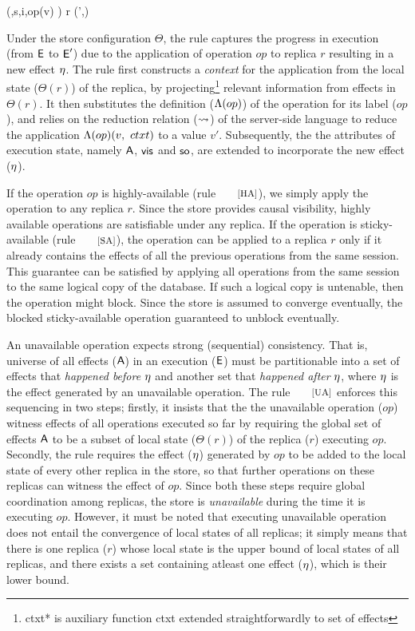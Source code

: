 \begin{smathpar}
\auxred{\Theta} {(\E,\langle s,i,op(v) \rangle)} {r} {(\E',\eff)}
\end{smathpar}

\noindent Under the store configuration $\Theta$, the rule captures
the progress in execution (from ${\normalfont \textsf{E}}$ to ${\normalfont \textsf{E}}'$) due to the application
of operation $op$ to replica $r$ resulting in a new effect $\eta$.
The rule first constructs a \emph{context} for the application from
the local state ($\Theta(r)$) of the replica, by
projecting\footnote{{\textsf{ctxt*}} is auxiliary function
\textsf{ctxt} extended straightforwardly to set of effects} relevant
information from effects in $\Theta(r)$. It then substitutes the
definition ($\Lambda(op)$) of the operation for its label ($op$), and
relies on the reduction relation (${\normalfont \leadsto}$) of the server-side
language to reduce the application $\Lambda(op)(v,~ctxt)$ to a value
$v'$.  Subsequently, the the attributes of execution state, namely
${\normalfont \textsf{A}}$, ${\normalfont \textsf{vis}}$ and ${\normalfont \textsf{so}}$, are extended to incorporate
the new effect ($\eta$). 

If the operation $op$ is highly-available (rule $\rulelabel{HA}$), we
simply apply the operation to any replica $r$. Since the store
provides causal visibility, highly available operations are
satisfiable under any replica. If the operation is sticky-available
(rule $\rulelabel{SA}$), the operation can be applied to a replica $r$
only if it already contains the effects of all the previous operations
from the same session. This guarantee can be satisfied by applying all
operations from the same session to the same logical copy of the
database. If such a logical copy is untenable, then the operation
might block. Since the store is assumed to converge eventually, the
blocked sticky-available operation guaranteed to unblock eventually.

An unavailable operation expects strong (sequential) consistency.
That is, universe of all effects (${\normalfont \textsf{A}}$) in an execution (${\normalfont \textsf{E}}$)
must be partitionable into a set of effects that \emph{happened
before} $\eta$ and another set that \emph{happened after} $\eta$,
where $\eta$ is the effect generated by an unavailable operation. The
rule $\rulelabel{UA}$ enforces this sequencing in two steps; firstly,
it insists that the the unavailable operation ($op$) witness effects
of all operations executed so far by requiring the global set of
effects ${\normalfont \textsf{A}}$ to be a subset of local state ($\Theta(r)$) of the
replica ($r$) executing $op$. Secondly, the rule requires the effect
($\eta$) generated by $op$ to be added to the local state of every
other replica in the store, so that further operations on these
replicas can witness the effect of $op$. Since both these steps
require global coordination among replicas, the store is
\emph{unavailable} during the time it is executing $op$. However, it
must be noted that executing unavailable operation does not entail the
convergence of local states of all replicas; it simply means that
there is one replica ($r$) whose local state is the upper bound of
local states of all replicas, and there exists a set containing
atleast one effect ($\eta$), which is their lower bound.

